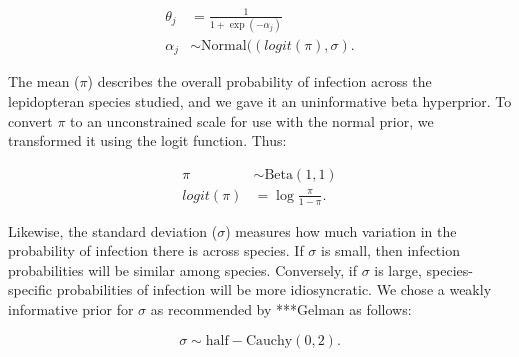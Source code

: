 \documentclass[12pt]{article}
\begin{document}
\begin{align}    
	\theta_{j} &= \frac{1}{1 + \exp(-\alpha_{j})} \\
    \alpha_{j} &\sim \mathrm{Normal}((logit(\pi), \sigma).
\end{align}

The mean ($\pi$) describes the overall probability of infection across the lepidopteran species studied, and we gave it an uninformative beta hyperprior. To convert $\pi$ to an unconstrained scale for use with the normal prior, we transformed it using the logit function. Thus:

\begin{align}
  \pi &\sim \mathrm{Beta}(1,1)\\
  logit(\pi) &= \log \frac{\pi}{1-\pi}.
\end{align}

Likewise, the standard deviation ($\sigma$) measures how much variation in the probability of infection there is across species. If $\sigma$ is small, then infection probabilities will be similar among species. Conversely, if $\sigma$ is large, species-specific probabilities of infection will be more idiosyncratic. We chose a weakly informative prior for $\sigma$ as recommended by ***Gelman as follows:

\begin{equation}
	\sigma \sim \mathrm{half-Cauchy}(0,2).
\end{equation}






 
\end{document}
